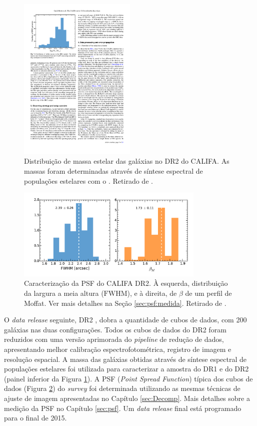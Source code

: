 \begin{figure}
	\includegraphics[width=0.5\textwidth]{figuras/CALIFAMass}
	\caption[Distribuição de massa das galáxias no  DR2 do CALIFA]
	{Distribuição de massa estelar das galáxias no DR2 do CALIFA. As massas
	foram determinadas através de síntese espectral de populações estelares com o
	\starlight. Retirado de \citet{GarciaBenito2015}.}
	\label{fig:DRMass}
\end{figure}

\begin{figure}
	\includegraphics[width=0.8\textwidth]{figuras/DR2PSF}
	\caption[Caracterização da PSF do CALIFA DR2]
	{Caracterização da PSF do CALIFA DR2. À esquerda, distribuição da largura a
	meia altura ($\mathrm{FWHM}$), e à direita, de $\beta$ de um perfil de Moffat.
	Ver mais detalhes na Seção \ref{sec:psf:medida}. Retirado de
	\citet{GarciaBenito2015}.}
	\label{fig:DR2PSF}
\end{figure}

O {\em data release} seguinte, DR2 \citep{GarciaBenito2015}, dobra a quantidade
de cubos de dados, com 200 galáxias nas duas configurações. Todos os cubos de
dados do DR2 foram reduzidos com uma versão aprimorada do {\em pipeline} de
redução de dados, apresentando melhor calibração espectrofotométrica, registro
de imagem e resolução espacial. A massa das galáxias obtidas através de síntese
espectral de populações estelares foi utilizada para caracterizar a amostra do
DR1 e do DR2 (painel inferior da Figura \ref{fig:DRMass}).
A PSF ({\em Point Spread Function}) típica dos cubos de dados (Figura
\ref{fig:DR2PSF}) do {\em survey} foi determinada utilizando as mesmas técnicas
de ajuste de imagem apresentadas no Capítulo \ref{sec:Decomp}. Mais detalhes
sobre a medição da PSF no Capítulo \ref{sec:psf}. Um {\em data release} final
está programado para o final de 2015.


